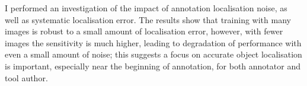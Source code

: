 I performed an investigation of the impact of annotation localisation noise, as well as systematic localisation error. The results show that training with many images is robust to a small amount of localisation error, however, with fewer images the sensitivity is much higher, leading to degradation of performance with even a small amount of noise; this suggests a focus on accurate object localisation is important, especially near the beginning of annotation, for both annotator and tool author.



